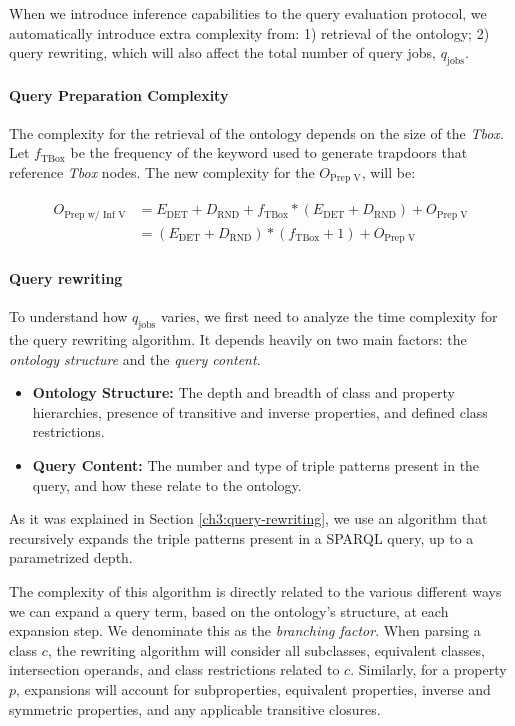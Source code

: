 When we introduce inference capabilities to the query evaluation protocol, we automatically introduce extra complexity from: 1) retrieval of the ontology; 2) query rewriting, which will also affect the total number of query jobs, $q_{\text{jobs}}$.

\paragraph{Query Preparation Complexity} The complexity for the retrieval of the ontology depends on the size of the \emph{Tbox}. Let $f_{\text{TBox}}$ be the frequency of the keyword used to generate trapdoors that reference \emph{Tbox} nodes. The new complexity for the $O_{\text{Prep V}}$, will be:

\begin{align}
    \label{equation:query-prep-inference}
    \begin{split}
        O_{\text{Prep w/ Inf V}} &= E_{\text{DET}} + D_{\text{RND}} + f_{\text{TBox}} * (E_{\text{DET}} + D_{\text{RND}}) + O_{\text{Prep V}} \\
        &= (E_{\text{DET}} + D_{\text{RND}}) * (f_{\text{TBox}} + 1) + O_{\text{Prep V}}
    \end{split} 
\end{align}

\paragraph{Query rewriting} To understand how $q_{\text{jobs}}$ varies, we first need to analyze the time complexity for the query rewriting algorithm. It depends heavily on two main factors: the \emph{ontology structure} and the \emph{query content}.

\begin{itemize}
    \item \textbf{Ontology Structure:} The depth and breadth of class and property hierarchies, presence of transitive and inverse properties, and defined class restrictions.
    \item \textbf{Query Content:} The number and type of triple patterns present in the query, and how these relate to the ontology.
\end{itemize}

As it was explained in Section \ref{ch3:query-rewriting}, we use an algorithm that recursively expands the triple patterns present in a \gls{SPARQL} query, up to a parametrized depth.

The complexity of this algorithm is directly related to the various different ways we can expand a query term, based on the ontology's structure, at each expansion step. We denominate this as the \emph{branching factor}. When parsing a class $c$, the rewriting algorithm will consider all subclasses, equivalent classes, intersection operands, and class restrictions related to $c$. Similarly, for a property $p$, expansions will account for subproperties, equivalent properties, inverse and symmetric properties, and any applicable transitive closures.

